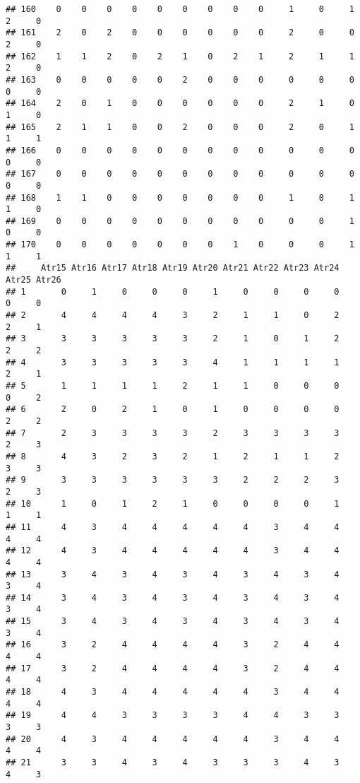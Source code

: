 \documentclass[
]{article}
\begin{document}
\begin{verbatim}
## 160    0    0    0    0    0    0    0    0    0     1     0     1     2     0
## 161    2    0    2    0    0    0    0    0    0     2     0     0     2     0
## 162    1    1    2    0    2    1    0    2    1     2     1     1     2     0
## 163    0    0    0    0    0    2    0    0    0     0     0     0     0     0
## 164    2    0    1    0    0    0    0    0    0     2     1     0     1     0
## 165    2    1    1    0    0    2    0    0    0     2     0     1     1     1
## 166    0    0    0    0    0    0    0    0    0     0     0     0     0     0
## 167    0    0    0    0    0    0    0    0    0     0     0     0     0     0
## 168    1    1    0    0    0    0    0    0    0     1     0     1     1     0
## 169    0    0    0    0    0    0    0    0    0     0     0     1     0     0
## 170    0    0    0    0    0    0    0    1    0     0     0     1     1     1
##     Atr15 Atr16 Atr17 Atr18 Atr19 Atr20 Atr21 Atr22 Atr23 Atr24 Atr25 Atr26
## 1       0     1     0     0     0     1     0     0     0     0     0     0
## 2       4     4     4     4     3     2     1     1     0     2     2     1
## 3       3     3     3     3     3     2     1     0     1     2     2     2
## 4       3     3     3     3     3     4     1     1     1     1     2     1
## 5       1     1     1     1     2     1     1     0     0     0     0     2
## 6       2     0     2     1     0     1     0     0     0     0     2     2
## 7       2     3     3     3     3     2     3     3     3     3     2     3
## 8       4     3     2     3     2     1     2     1     1     2     3     3
## 9       3     3     3     3     3     3     2     2     2     3     2     3
## 10      1     0     1     2     1     0     0     0     0     1     1     1
## 11      4     3     4     4     4     4     4     3     4     4     4     4
## 12      4     3     4     4     4     4     4     3     4     4     4     4
## 13      3     4     3     4     3     4     3     4     3     4     3     4
## 14      3     4     3     4     3     4     3     4     3     4     3     4
## 15      3     4     3     4     3     4     3     4     3     4     3     4
## 16      3     2     4     4     4     4     3     2     4     4     4     4
## 17      3     2     4     4     4     4     3     2     4     4     4     4
## 18      4     3     4     4     4     4     4     3     4     4     4     4
## 19      4     4     3     3     3     3     4     4     3     3     3     3
## 20      4     3     4     4     4     4     4     3     4     4     4     4
## 21      3     3     4     3     4     3     3     3     4     3     4     3

\end{verbatim}
\end{document}
